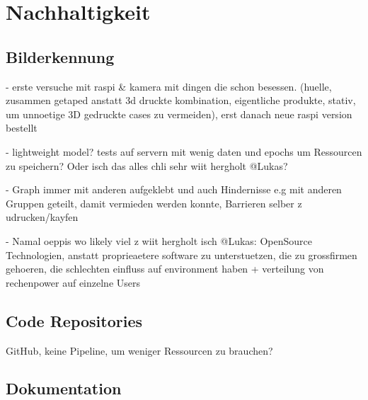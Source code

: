 \section{Nachhaltigkeit}







\subsection{Bilderkennung}

- erste versuche mit raspi \& kamera mit dingen die schon besessen. (huelle, zusammen getaped anstatt 3d druckte kombination, eigentliche produkte, stativ, um unnoetige 3D gedruckte cases zu vermeiden), erst danach neue raspi version bestellt

- lightweight model? tests auf servern mit wenig daten und epochs um Ressourcen zu speichern? Oder isch das alles chli sehr wiit hergholt @Lukas?

- Graph immer mit anderen aufgeklebt und auch Hindernisse e.g mit anderen Gruppen geteilt, damit vermieden werden konnte, Barrieren selber z udrucken/kayfen

- Namal oeppis wo likely viel z wiit hergholt isch @Lukas: OpenSource Technologien, anstatt proprieaetere software zu unterstuetzen, die zu grossfirmen gehoeren, die schlechten einfluss auf environment haben  + verteilung von rechenpower auf einzelne Users 

\subsection{Code Repositories}

GitHub\cite{github-sustainability}, keine Pipeline, um weniger Ressourcen zu brauchen?



\subsection{Dokumentation}

